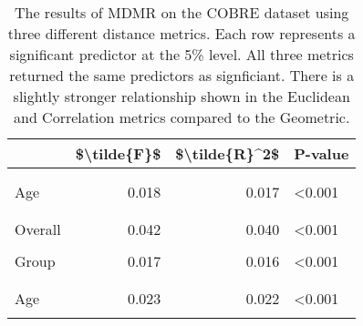 \documentclass[
]{article}
\author{}
\date{\vspace{-2.5em}}
\begin{document}
\begin{table}

\caption{\label{tab:cobre_tab}The results of MDMR on the COBRE dataset using three different distance metrics.  Each row represents a significant predictor at the 5\% level.  All three metrics returned the same predictors as signficiant.  There is a slightly stronger relationship shown in the Euclidean and Correlation metrics compared to the Geometric.}
\centering
\begin{tabular}[t]{lrrl}
\toprule
 & \$\textbackslash{}tilde\{F\}\$ & \$\textbackslash{}tilde\{R\}\textasciicircum{}2\$ & P-value\\
\midrule
\addlinespace[0.3em]
\multicolumn{4}{l}{\textbf{Geometric}}\\
\hspace{1em}\cellcolor{gray!6}{Overall} & \cellcolor{gray!6}{0.030} & \cellcolor{gray!6}{0.029} & \cellcolor{gray!6}{<0.001}\\
\hspace{1em}Age & 0.018 & 0.017 & <0.001\\
\hspace{1em}\cellcolor{gray!6}{Group} & \cellcolor{gray!6}{0.012} & \cellcolor{gray!6}{0.011} & \cellcolor{gray!6}{<0.001}\\
\addlinespace[0.3em]
\multicolumn{4}{l}{\textbf{Euclidean}}\\
\hspace{1em}Overall & 0.042 & 0.040 & <0.001\\
\hspace{1em}\cellcolor{gray!6}{Age} & \cellcolor{gray!6}{0.024} & \cellcolor{gray!6}{0.023} & \cellcolor{gray!6}{<0.001}\\
\hspace{1em}Group & 0.017 & 0.016 & \vphantom{1} <0.001\\
\addlinespace[0.3em]
\multicolumn{4}{l}{\textbf{Correlation}}\\
\hspace{1em}\cellcolor{gray!6}{Overall} & \cellcolor{gray!6}{0.041} & \cellcolor{gray!6}{0.040} & \cellcolor{gray!6}{<0.001}\\
\hspace{1em}Age & 0.023 & 0.022 & <0.001\\
\hspace{1em}\cellcolor{gray!6}{Group} & \cellcolor{gray!6}{0.017} & \cellcolor{gray!6}{0.016} & \cellcolor{gray!6}{<0.001}\\
\bottomrule
\end{tabular}
\end{table}
\end{document}
